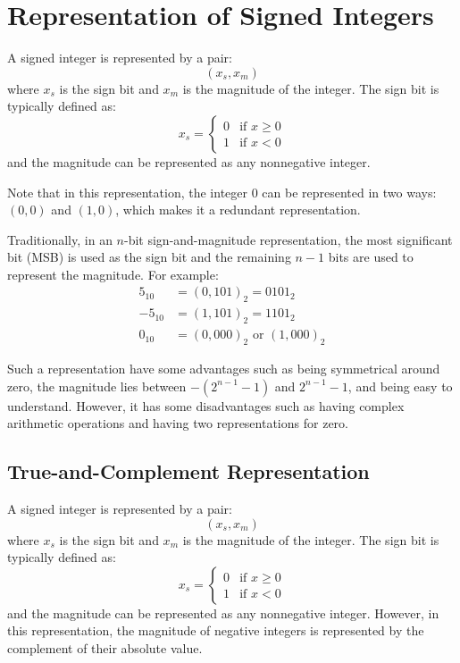 \section{Representation of Signed Integers}
\begin{definition}
    A signed integer is represented by a pair:
    \[
        (x_s,x_m)
    \]
    where $x_s$ is the sign bit and $x_m$ is the magnitude of the integer. The sign bit is typically defined as:
    \[
        x_s = \begin{cases}
        0 & \text{if } x \geq 0 \\
        1 & \text{if } x < 0
        \end{cases}
    \]
    and the magnitude can be represented as any nonnegative integer.
\end{definition}
Note that in this representation, the integer $0$ can be represented in two ways: $(0,0)$ and $(1,0)$, which makes it a redundant representation.

\begin{eg}
    Traditionally, in an $n$-bit sign-and-magnitude representation, the most significant bit (MSB) is used as the sign bit and the remaining $n - 1$ bits are used to represent the magnitude. For example:
    \begin{align*}
        5_{10} &= (0, 101)_2 = 0101_2 \\
        -5_{10} &= (1, 101)_2 = 1101_2 \\
        0_{10} &= (0, 000)_2 \text{ or } (1, 000)_2
    \end{align*}
\end{eg}
Such a representation have some advantages such as being symmetrical around zero, the magnitude lies between $-(2^{n-1} - 1)$ and $2^{n-1} - 1$, and being easy to understand. However, it has some disadvantages such as having complex arithmetic operations and having two representations for zero.

\subsection{True-and-Complement Representation}
\begin{definition}
    A signed integer is represented by a pair:
    \[
        (x_s,x_m)
    \]
    where $x_s$ is the sign bit and $x_m$ is the magnitude of the integer. The sign bit is typically defined as:
    \[
        x_s = \begin{cases}
        0 & \text{if } x \geq 0 \\
        1 & \text{if } x < 0
        \end{cases}
    \]
    and the magnitude can be represented as any nonnegative integer. However, in this representation, the magnitude of negative integers is represented by the complement of their absolute value.
\end{definition}